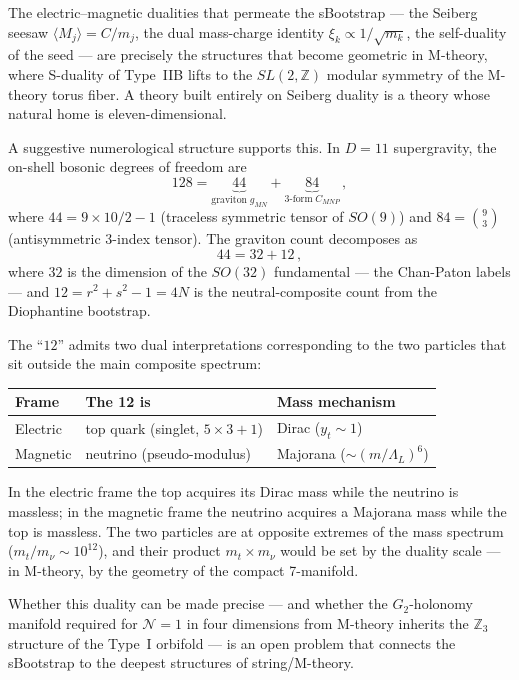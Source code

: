 \documentclass[12pt,a4paper]{article}
\begin{document}
The electric--magnetic dualities that permeate the sBootstrap ---
the Seiberg seesaw $\langle M_j\rangle = C/m_j$, the dual
mass-charge identity $\xi_k \propto 1/\sqrt{m_k}$, the
self-duality of the seed --- are precisely the structures that
become geometric in M-theory, where S-duality of Type~IIB lifts
to the $SL(2,\mathbb{Z})$ modular symmetry of the M-theory torus
fiber.  A theory built entirely on Seiberg duality is a theory
whose natural home is eleven-dimensional.

A suggestive numerological structure supports this.  In $D = 11$
supergravity, the on-shell bosonic degrees of freedom are
\begin{equation}
  128 = \underbrace{44}_{\text{graviton}\; g_{MN}}
      + \underbrace{84}_{\text{3-form}\; C_{MNP}}\,,
\end{equation}
where $44 = 9 \times 10/2 - 1$ (traceless symmetric tensor of
$SO(9)$) and $84 = \binom{9}{3}$ (antisymmetric 3-index tensor).
The graviton count decomposes as
\begin{equation}
  44 = 32 + 12\,,
\end{equation}
where $32$ is the dimension of the $SO(32)$ fundamental ---
the Chan-Paton labels --- and $12 = r^2 + s^2 - 1 = 4N$ is the
neutral-composite count from the Diophantine bootstrap.

The ``$12$'' admits two dual interpretations corresponding to
the two particles that sit outside the main composite spectrum:

\begin{center}
\begin{tabular}{lll}
\toprule
Frame & The 12 is & Mass mechanism \\
\midrule
Electric & top quark (singlet, $5\!\times\!3+1$)
  & Dirac ($y_t \sim 1$) \\
Magnetic & neutrino (pseudo-modulus)
  & Majorana ($\sim (m/\Lambda_L)^6$) \\
\bottomrule
\end{tabular}
\end{center}

\noindent
In the electric frame the top acquires its Dirac mass while the
neutrino is massless; in the magnetic frame the neutrino acquires
a Majorana mass while the top is massless.  The two particles are
at opposite extremes of the mass spectrum ($m_t/m_\nu \sim 10^{12}$),
and their product $m_t \times m_\nu$ would be set by the
duality scale --- in M-theory, by the geometry of the
compact 7-manifold.

Whether this duality can be made precise --- and whether the
$G_2$-holonomy manifold required for $\mathcal{N}=1$ in four
dimensions from M-theory inherits the $\mathbb{Z}_3$ structure
of the Type~I orbifold --- is an open problem that connects the
sBootstrap to the deepest structures of string/M-theory.
\end{document}
